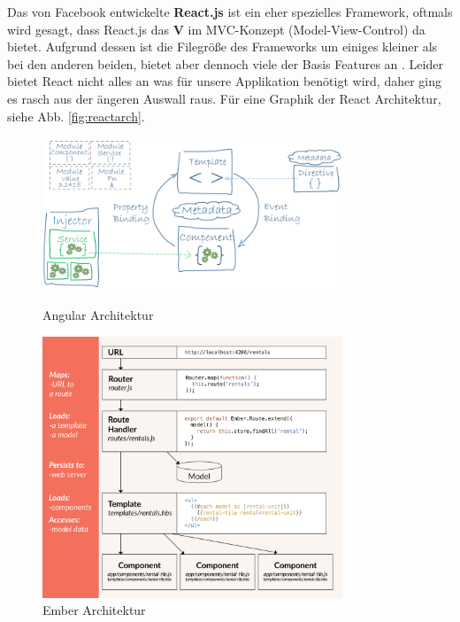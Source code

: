 Das von Facebook entwickelte \textbf{React.js} ist ein eher spezielles Framework, oftmals wird gesagt, dass React.js das \textbf{V} im MVC-Konzept (Model-View-Control) da bietet. Aufgrund dessen ist die Filegröße des Frameworks um einiges kleiner als bei den anderen beiden, bietet aber dennoch viele der Basis Features an \cite{MELD.CH3-web-app.react}. Leider bietet React nicht alles an was für unsere Applikation benötigt wird, daher ging es rasch aus der ängeren Auswall raus. Für eine Graphik der React Architektur, siehe Abb. \ref{fig:reactarch}.

\begin{figure}[!tbp]
 	\centering
 	\begin{minipage}[b]{0.8\textwidth}
 		\centering
 		\includegraphics[width=0.8\textwidth]{images/angular}
		\caption{Angular Architektur \cite{MELD.CH3-web-app.angular}}
		\label{fig:angulararch}
 	\end{minipage}
 	\hfill
 	\begin{minipage}[b]{0.8\textwidth}
 		\centering
 		\includegraphics[width=0.8\textwidth]{images/ember}
		\caption{Ember Architektur \cite{MELD.CH3-web-app.ember}}
		\label{fig:emberarch}

\end{minipage}
\end{figure}
